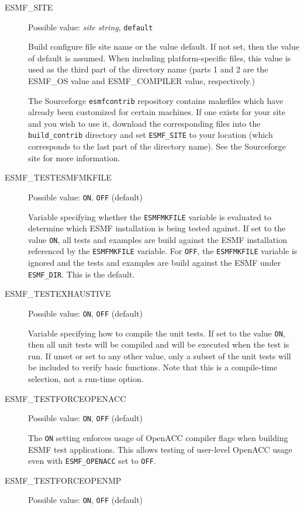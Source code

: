 \begin{description}
\item[ESMF\_SITE]
Possible value: {\em site string}, {\tt default}

Build configure file site name or the value default. If not set, then the value
of default is assumed. When including platform-specific files, this value is 
used as the third part of the directory name (parts 1 and 2 are the
ESMF\_OS value and ESMF\_COMPILER value, respectively.)

The Sourceforge {\tt esmfcontrib} repository contains makefiles which have 
already been customized for certain machines.  If one exists for your site 
and you wish to use it, download the corresponding files into the 
{\tt build\_contrib} directory and set {\tt ESMF\_SITE} to your location
(which corresponds to the last part of the directory name).  See the 
Sourceforge site 
 for more information.

\item[ESMF\_TESTESMFMKFILE] 
Possible value: {\tt ON}, {\tt OFF} (default)

Variable specifying whether the {\tt ESMFMKFILE} variable is evaluated to
determine which ESMF installation is being tested against. If set to the 
value {\tt ON}, all tests and examples are build against the ESMF installation
referenced by the {\tt ESMFMKFILE} variable. For {\tt OFF}, the 
{\tt ESMFMKFILE} variable is ignored and the tests and examples are build
against the ESMF under {\tt ESMF\_DIR}. This is the default.

\item[ESMF\_TESTEXHAUSTIVE] 
Possible value: {\tt ON}, {\tt OFF} (default)

Variable specifying how to compile the unit tests. If set to the value {\tt ON},
then all unit tests will be compiled and will be executed when the test is
run.  If unset or set to any other value, only a subset of the unit tests
will be included to verify basic functions. Note that this is a compile-time
selection, not a run-time option.

\item[ESMF\_TESTFORCEOPENACC] 
Possible value: {\tt ON}, {\tt OFF} (default)

The {\tt ON} setting enforces usage of OpenACC compiler flags when building ESMF test applications. This allows testing of user-level OpenACC usage even with {\tt ESMF\_OPENACC} set to {\tt OFF}.

\item[ESMF\_TESTFORCEOPENMP] 
Possible value: {\tt ON}, {\tt OFF} (default)


\end{description}
